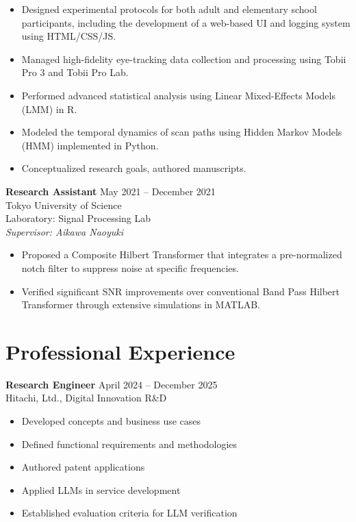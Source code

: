 \documentclass[letterpaper,10.5pt]{article}
\begin{document}
\begin{itemize}
  \item Designed experimental protocols for both adult and elementary school participants, including the development of a web-based UI and logging system using HTML/CSS/JS.
  \item Managed high-fidelity eye-tracking data collection and processing using Tobii Pro 3 and Tobii Pro Lab.
  \item Performed advanced statistical analysis using Linear Mixed-Effects Models (LMM) in R.
  \item Modeled the temporal dynamics of scan paths using Hidden Markov Models (HMM) implemented in Python.
  \item Conceptualized research goals, authored manuscripts.
\end{itemize}
\vspace{8pt}
\textbf{Research Assistant} \hfill May 2021 -- December 2021 \\ 
Tokyo University of Science \\ 
{\small {Laboratory: Signal Processing Lab}} \\ 
{\small \textit{Supervisor: Aikawa Naoyuki}} \\ 
\begin{itemize}
  \item Proposed a Composite Hilbert Transformer that integrates a pre-normalized notch filter to suppress noise at specific frequencies.
  \item Verified significant SNR improvements over conventional Band Pass Hilbert Transformer through extensive simulations in MATLAB.
\end{itemize}
\vspace{8pt}
\section*{Professional Experience}
\textbf{Research Engineer} \hfill April 2024 -- December 2025 \\ 
Hitachi, Ltd., Digital Innovation R\&D \\ 
\begin{itemize}
  \item Developed concepts and business use cases
  \item Defined functional requirements and methodologies
  \item Authored patent applications
  \item Applied LLMs in service development
  \item Established evaluation criteria for LLM verification
\end{itemize}
\vspace{8pt}
\end{document}

